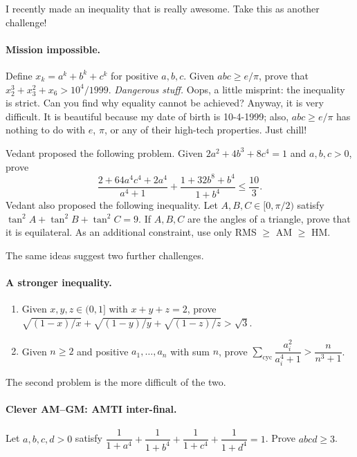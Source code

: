 \documentclass[11pt,a4paper]{article}
\begin{document}
I recently made an inequality that is really awesome. Take this as another challenge!
\paragraph{Mission impossible.}
Define $x_k=a^k+b^k+c^k$ for positive $a,b,c$.
Given $abc\geq e/\pi$, prove that
$x_2^3+x_3^2+x_6>10^4/1999$.
\emph{Dangerous stuff.}
Oops, a little misprint: the inequality is strict. Can you find why
equality cannot be achieved? Anyway, it is very difficult. It is beautiful
because my date of birth is 10-4-1999; also, $abc\geq e/\pi$ has nothing
to do with $e$, $\pi$, or any of their high-tech properties. Just chill!

Vedant proposed the following problem.
Given $2a^2+4b^3+8c^4=1$ and $a,b,c>0$, prove
\[
\frac{2+64a^4c^4+2a^4}{a^4+1}
+\frac{1+32b^8+b^4}{1+b^4}\leq\frac{10}{3}.
\]
Vedant also proposed the following inequality.
Let $A,B,C\in[0,\pi/2)$ satisfy $\tan^2A+\tan^2B+\tan^2C=9$.
If $A,B,C$ are the angles of a triangle, prove that it is equilateral.
As an additional constraint, use only RMS $\geq$ AM $\geq$ HM.

The same ideas suggest two further challenges.
\paragraph{A stronger inequality.}
\begin{enumerate}
\setcounter{enumi}{0}\item Given $x,y,z\in(0,1]$ with $x+y+z=2$, prove
$\sqrt{(1-x)/x}+\sqrt{(1-y)/y}+\sqrt{(1-z)/z}>\sqrt3$.
\setcounter{enumi}{1}\item Given $n\geq2$ and positive $a_1,\ldots,a_n$ with sum $n$, prove
$\sum_{\mathrm{cyc}}\dfrac{a_i^2}{a_i^4+1}>\dfrac{n}{n^3+1}$.
\end{enumerate}
The second problem is the more difficult of the two.

\paragraph{Clever AM--GM: AMTI inter-final.}
Let $a,b,c,d>0$ satisfy
$\dfrac1{1+a^4}+\dfrac1{1+b^4}+\dfrac1{1+c^4}+\dfrac1{1+d^4}=1$.
Prove $abcd\geq3$.
\end{document}
